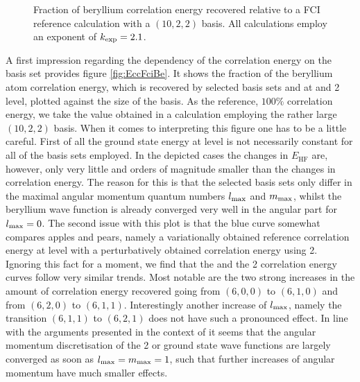 \begin{figure}
	\centering
	\caption[
		Fraction of beryllium correlation energy
		recovered with selected \CS bases
	]{
		Fraction of beryllium correlation energy recovered
		relative to a FCI reference calculation with a $(10, 2, 2)$ \CS basis.
		All calculations employ an exponent of $k_\text{exp} = 2.1$.
	}
	\label{fig:EccFciBe}
\end{figure}
A first impression regarding the dependency of the correlation energy
on the \CS basis set provides figure \vref{fig:EccFciBe}.
It shows the fraction of the beryllium atom correlation energy, which is recovered
by selected \CS basis sets and at \FCI and {\MP}2 level,
plotted against the size of the basis.
As the reference, \ie $100\%$ correlation energy,
we take the value obtained in a \FCI calculation employing
the rather large $(10,2,2)$ \CS basis.
When it comes to interpreting this figure one has to be a little careful.
First of all the ground state energy at \HF level is
not necessarily constant for all of the basis sets employed.
In the depicted cases the changes in $E_\text{HF}$ are,
however, only very little and orders of magnitude
smaller than the changes in correlation energy.
The reason for this is that the selected basis sets only differ
in the maximal angular momentum quantum numbers $l_\text{max}$ and $m_\text{max}$,
whilst the beryllium \HF wave function is already
converged very well in the angular part for $l_\text{max} = 0$.
The second issue with this plot
is that the blue curve somewhat compares apples and pears,
namely a variationally obtained reference correlation energy at \FCI level
with a perturbatively obtained correlation energy using {\MP}2.
Ignoring this fact for a moment,
we find that the \FCI and the {\MP}2 correlation energy curves
follow very similar trends.
Most notable are the two strong increases in the amount of correlation
energy recovered going from $(6,0,0)$ to $(6,1,0)$
and from $(6,2,0)$ to $(6,1,1)$.
Interestingly another increase of $l_\text{max}$,
namely the transition $(6,1,1)$ to $(6,2,1)$
does not have such a pronounced effect.
In line with the arguments presented in the context of \HF
it seems that the angular momentum discretisation
of the {\MP}2 or \FCI ground state wave functions
are largely converged as soon as $l_\text{max} = m_\text{max} = 1$,
such that further increases of angular momentum have much smaller effects.


